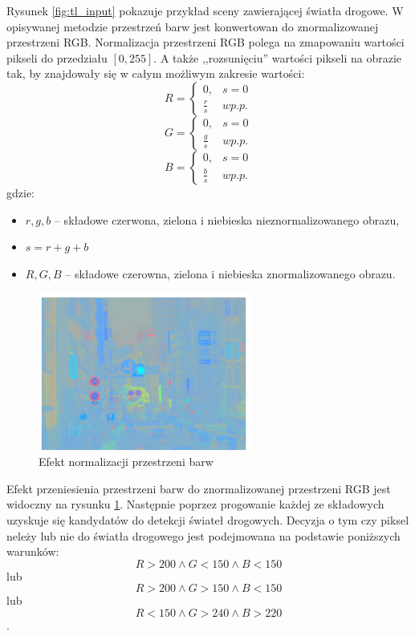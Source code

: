 Rysunek \ref{fig:tl_input} pokazuje przykład sceny zawierającej światła drogowe. W opisywanej metodzie przestrzeń barw jest konwertowan do znormalizowanej przestrzeni RGB. Normalizacja przestrzeni RGB polega na zmapowaniu wartości pikseli do przedziału $[0,255]$. A także ,,rozsunięciu'' wartości pikseli na obrazie tak, by znajdowały się w całym możliwym zakresie wartości:
\begin{equation}
R=\left\{\begin{matrix}
0, &  s=0\\
\frac{r}{s} & w p.p.
\end{matrix}\right.
\end{equation}
\begin{equation}
G=\left\{\begin{matrix}
0, &  s=0\\
\frac{g}{s} & w p.p.
\end{matrix}\right.
\end{equation}
\begin{equation}
B=\left\{\begin{matrix}
0, &  s=0\\
\frac{b}{s} & w p.p.
\end{matrix}\right.
\end{equation}
gdzie:
\begin{itemize}
\item$r,g,b$ -- składowe czerwona, zielona i niebieska nieznormalizowanego obrazu,
\item$s = r+g+b$
\item$R,G,B$ -- składowe czerowna, zielona i niebieska znormalizowanego obrazu.
\end{itemize}


\begin{figure}
  \centering
  \includegraphics[width=7cm]{img/tl_norm.png}
  \caption{Efekt normalizacji przestrzeni barw\cite{T4}}
  \label{fig:tl_norm}
\end{figure}

Efekt przeniesienia przestrzeni barw do znormalizowanej przestrzeni RGB jest widoczny na rysunku \ref{fig:tl_norm}.
Następnie poprzez progowanie każdej ze składowych uzyskuje się kandydatów do detekcji świateł drogowych. Decyzja o tym czy piksel neleży lub nie do światła drogowego jest podejmowana na podstawie poniższych warunków:
\begin{equation}
R>200 \wedge G< 150 \wedge B<150
\end{equation}
lub
\begin{equation}
R>200 \wedge G> 150 \wedge B<150
\end{equation} 
lub
\begin{equation}
R<150 \wedge G>240 \wedge B>220
\end{equation}.

